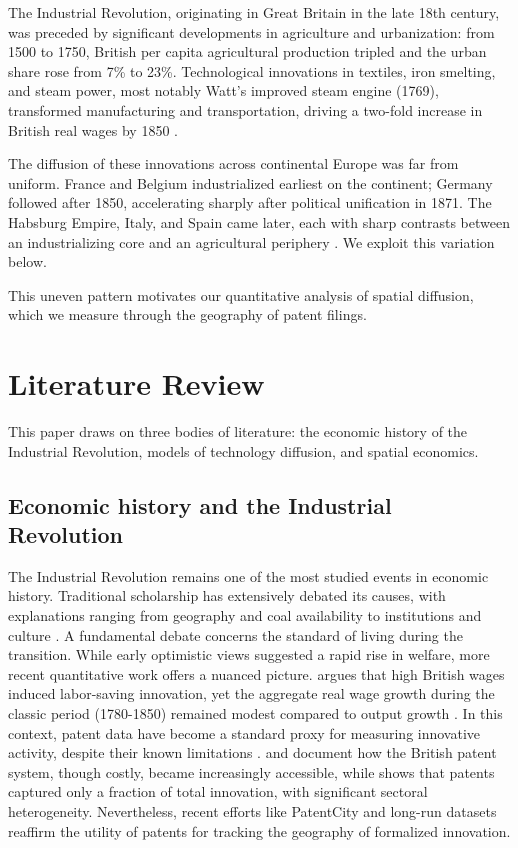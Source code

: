 \documentclass[letterpaper,12pt,leqno]{article}
\begin{document}
The Industrial Revolution, originating in Great Britain in the late 18th century, was preceded by significant developments in agriculture and urbanization: from 1500 to 1750, British per capita agricultural production tripled \citep{broadberry2015british} and the urban share rose from 7\% to 23\%. Technological innovations in textiles, iron smelting, and steam power, most notably Watt's improved steam engine (1769), transformed manufacturing and transportation, driving a two-fold increase in British real wages by 1850 \citep{allen2015high}.

The diffusion of these innovations across continental Europe was far from uniform. France and Belgium industrialized earliest on the continent; Germany followed after 1850, accelerating sharply after political unification in 1871. The Habsburg Empire, Italy, and Spain came later, each with sharp contrasts between an industrializing core and an agricultural periphery \citep{pollard1981peaceful}. We exploit this variation below.

This uneven pattern motivates our quantitative analysis of spatial diffusion, which we measure through the geography of patent filings.

\section{Literature Review}
This paper draws on three bodies of literature: the economic history of the Industrial Revolution, models of technology diffusion, and spatial economics.

\subsection{Economic history and the Industrial Revolution}
The Industrial Revolution remains one of the most studied events in economic history. Traditional scholarship has extensively debated its causes, with explanations ranging from geography and coal availability \citep{wrigley2013energy, pomeranz2000great, fernihough2021coal} to institutions \citep{north1990institutions, acemoglu2001colonial} and culture \citep{mokyr1992lever}.
A fundamental debate concerns the standard of living during the transition. While early optimistic views suggested a rapid rise in welfare, more recent quantitative work offers a nuanced picture. \citet{allen2015high} argues that high British wages induced labor-saving innovation, yet the aggregate real wage growth during the classic period (1780-1850) remained modest compared to output growth \citep{allen2009british}.
In this context, patent data have become a standard proxy for measuring innovative activity, despite their known limitations \citep{griliches1990patent}. \citet{bottomley2014patent} and \citet{macleod1988inventing} document how the British patent system, though costly, became increasingly accessible, while \citet{moser2005patent} shows that patents captured only a fraction of total innovation, with significant sectoral heterogeneity. Nevertheless, recent efforts like PatentCity \citep{bergeaud2024new} and long-run datasets \citep{berkes2026three} reaffirm the utility of patents for tracking the geography of formalized innovation.
\end{document}
